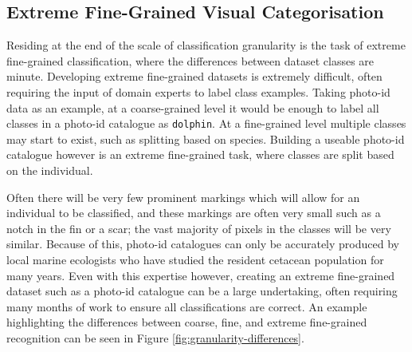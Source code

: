 \subsection{Extreme Fine-Grained Visual Categorisation}\label{ch:Background,sec:ExtremeFine-grainedCV}

Residing at the end of the scale of classification granularity is the task of extreme fine-grained classification, where the differences between dataset classes are minute. Developing extreme fine-grained datasets is extremely difficult, often requiring the input of domain experts to label class examples. Taking photo-id data as an example, at a coarse-grained level it would be enough to label all classes in a photo-id catalogue as \texttt{dolphin}. At a fine-grained level multiple classes may start to exist, such as splitting based on species. Building a useable photo-id catalogue however is an extreme fine-grained task, where classes are split based on the individual. 

Often there will be very few prominent markings which will allow for an individual to be classified, and these markings are often very small such as a notch in the fin or a scar; the vast majority of pixels in the classes will be very similar. Because of this, photo-id catalogues can only be accurately produced by local marine ecologists who have studied the resident cetacean population for many years. Even with this expertise however, creating an extreme fine-grained dataset such as a photo-id catalogue can be a large undertaking, often requiring many months of work to ensure all classifications are correct. An example highlighting the differences between coarse, fine, and extreme fine-grained recognition can be seen in Figure \ref{fig:granularity-differences}.

